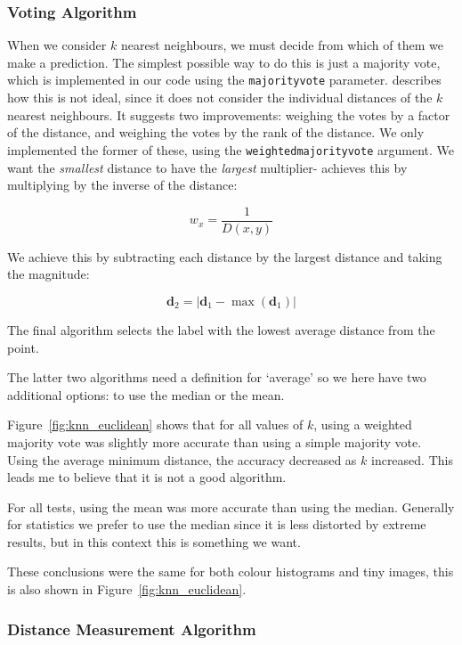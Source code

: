 \documentclass{article}
\begin{document}
\begin{multicols}{2}
\subsubsection{Voting Algorithm}
When we consider $k$ nearest neighbours, we must decide from which of them we make a prediction. The simplest possible way to do this is just a majority vote, which is implemented in our code using the \texttt{majorityvote} parameter. \cite{dudani} describes how this is not ideal, since it does not consider the individual distances of the $k$ nearest neighbours. It suggests two improvements: weighing the votes by a factor of the distance, and weighing the votes by the rank of the distance. We only implemented the former of these, using the \texttt{weightedmajorityvote} argument. We want the \textit{smallest} distance to have the \textit{largest} multiplier- \cite{dudani}  achieves this by multiplying by the inverse of the distance:

$$ w_{x} = \frac{1}{D(x, y)} $$

We achieve this by subtracting each distance by the largest distance and taking the magnitude:

$$ \textbf{d}_{2} = \left| \textbf{d}_{1}  - \max(\textbf{d}_{1}) \right| $$

The final algorithm selects the label with the lowest average distance from the point.

The latter two algorithms need a definition for `average' so we here have two additional options: to use the median or the mean.

Figure~\ref{fig:knn_euclidean} shows that for all values of $k$, using a weighted majority vote was slightly more accurate than using a simple majority vote. Using the average minimum distance, the accuracy decreased as $k$ increased. This leads me to believe that it is not a good algorithm.

For all tests, using the mean was more accurate than using the median. Generally for statistics we prefer to use the median since it is less distorted by extreme results, but in this context this is something we want.

These conclusions were the same for both colour histograms and tiny images, this is also shown in Figure~\ref{fig:knn_euclidean}.

\subsubsection{Distance Measurement Algorithm}


\end{multicols}
\end{document}
